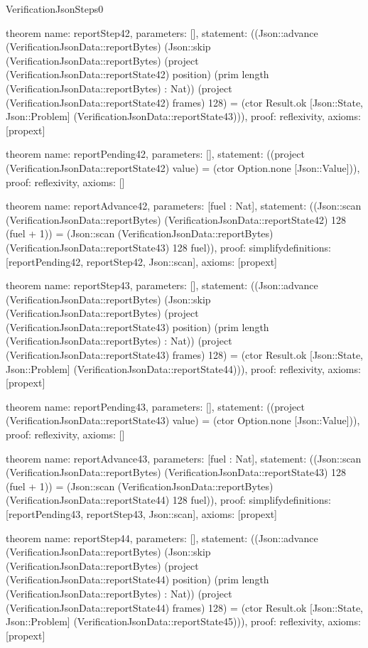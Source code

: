 \begin{lexlean}{VerificationJsonSteps0}
\begin{semanticmodule}
theorem{
  name: reportStep42,
  parameters: [],
  statement: ((Json::advance (VerificationJsonData::reportBytes) (Json::skip (VerificationJsonData::reportBytes) (project (VerificationJsonData::reportState42) position) (prim length (VerificationJsonData::reportBytes) : Nat)) (project (VerificationJsonData::reportState42) frames) 128) = (ctor Result.ok [Json::State, Json::Problem] (VerificationJsonData::reportState43))),
  proof: reflexivity{},
  axioms: [propext]
}

theorem{
  name: reportPending42,
  parameters: [],
  statement: ((project (VerificationJsonData::reportState42) value) = (ctor Option.none [Json::Value])),
  proof: reflexivity{},
  axioms: []
}

theorem{
  name: reportAdvance42,
  parameters: [fuel : Nat],
  statement: ((Json::scan (VerificationJsonData::reportBytes) (VerificationJsonData::reportState42) 128 (fuel + 1)) = (Json::scan (VerificationJsonData::reportBytes) (VerificationJsonData::reportState43) 128 fuel)),
  proof: simplify{definitions: [reportPending42, reportStep42, Json::scan]},
  axioms: [propext]
}

theorem{
  name: reportStep43,
  parameters: [],
  statement: ((Json::advance (VerificationJsonData::reportBytes) (Json::skip (VerificationJsonData::reportBytes) (project (VerificationJsonData::reportState43) position) (prim length (VerificationJsonData::reportBytes) : Nat)) (project (VerificationJsonData::reportState43) frames) 128) = (ctor Result.ok [Json::State, Json::Problem] (VerificationJsonData::reportState44))),
  proof: reflexivity{},
  axioms: [propext]
}

theorem{
  name: reportPending43,
  parameters: [],
  statement: ((project (VerificationJsonData::reportState43) value) = (ctor Option.none [Json::Value])),
  proof: reflexivity{},
  axioms: []
}

theorem{
  name: reportAdvance43,
  parameters: [fuel : Nat],
  statement: ((Json::scan (VerificationJsonData::reportBytes) (VerificationJsonData::reportState43) 128 (fuel + 1)) = (Json::scan (VerificationJsonData::reportBytes) (VerificationJsonData::reportState44) 128 fuel)),
  proof: simplify{definitions: [reportPending43, reportStep43, Json::scan]},
  axioms: [propext]
}

theorem{
  name: reportStep44,
  parameters: [],
  statement: ((Json::advance (VerificationJsonData::reportBytes) (Json::skip (VerificationJsonData::reportBytes) (project (VerificationJsonData::reportState44) position) (prim length (VerificationJsonData::reportBytes) : Nat)) (project (VerificationJsonData::reportState44) frames) 128) = (ctor Result.ok [Json::State, Json::Problem] (VerificationJsonData::reportState45))),
  proof: reflexivity{},
  axioms: [propext]
}


\end{semanticmodule}
\end{lexlean}

